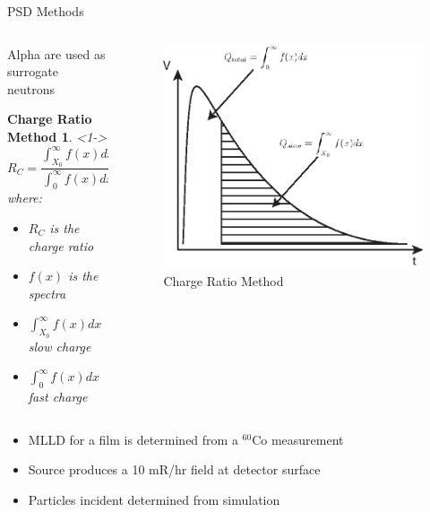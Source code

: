 \begin{frame}{PSD Methods}
\begin{columns}[onlytextwidth]
\begin{column}{0.45\textwidth}
	Alpha are used as surrogate neutrons
	\newtheorem{thm9}{Charge Ratio Method}
	\begin{thm9}<1->
		$$ R_C = \frac{\int_{X_0}^{\infty}{f(x)dx}}{\int_{0}^{\infty}{f(x)dx}} $$
	where:
	\begin{itemize}
		\tiny
		\item $R_C$ is the charge ratio
		\item $f(x)$ is the spectra
		\item $\int_{X_0}^{\infty}{f(x)dx}$ slow charge
		\item $\int_{0}^{\infty}{f(x)dx}$ fast charge
	\end{itemize}
	\end{thm9}
\end{column}
\begin{column}{0.45\textwidth}
	\begin{figure}
		\centering
		\includegraphics[height=0.5\textwidth]{images/PSD_Spectra.eps}
		\caption{Charge Ratio Method}
		\label{fig:PSD_ChargeRatio}
	\end{figure}
\end{column}
\end{columns}

	\begin{itemize}
		\tiny
		\item MLLD for a film is determined from a ${}^{60}$Co measurement
		\item Source produces a 10 mR/hr field at detector surface
		\item Particles incident determined from simulation
	\end{itemize}
\end{frame}
